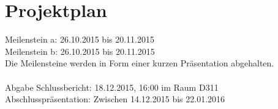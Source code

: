 \section{Projektplan}

Meilenstein a: 26.10.2015 bis 20.11.2015\\
Meilenstein b: 26.10.2015 bis 20.11.2015\\
Die Meilensteine werden in Form einer kurzen Präsentation abgehalten.\\\\

\noindent Abgabe Schlussbericht: 18.12.2015, 16:00 im Raum D311\\
Abschlusspräsentation: Zwischen 14.12.2015 bis 22.01.2016


\clearpage

\begin{landscape}

\end{landscape}
